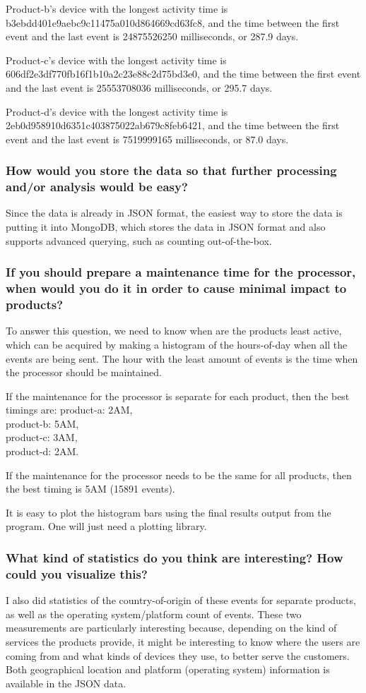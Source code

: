 \documentclass[12pt,letter]{article}
\begin{document}
  Product-b's device with the longest activity time is b3ebdd401e9aebc9c11475a010d864669cd63fc8, and the
  time between the first event and the last event is 24875526250 milliseconds,
  or 287.9 days.

  Product-c's device with the longest activity time is
  606df2e3df770fb16f1b10a2c23e88c2d75bd3e0, and the
  time between the first event and the last event is 25553708036 milliseconds,
  or 295.7 days.

  Product-d's device with the longest activity time is
  2eb0d958910d6351c403875022ab679c8feb6421, and the
  time between the first event and the last event is 7519999165 milliseconds,
  or 87.0 days.

  \subsubsection{How would you store the data so that further processing and/or
  analysis would be easy?}
  Since the data is already in JSON format, the easiest way to store the data is
  putting it into MongoDB, which stores the data in JSON format and also supports
  advanced querying, such as counting out-of-the-box.

  \subsubsection{If you should prepare a maintenance time for the processor,
  when would you do it in order to cause minimal impact to products?}
  To answer this question, we need to know when are the products least active,
  which can be acquired by making a histogram of the hours-of-day when all the events
  are being sent. The hour with the least amount of events is the time when the
  processor should be maintained.

  If the maintenance for the processor is separate for each product, then the
  best timings are:
  product-a: 2AM,\\
  product-b: 5AM,\\
  product-c: 3AM,\\
  product-d: 2AM.

  If the maintenance for the processor needs to be the same for all products,
  then the best timing is 5AM (15891 events).

  It is easy to plot the histogram bars using the final results output from the
  program. One will just need a plotting library.

  \subsubsection{What kind of statistics do you think are interesting? How could
  you visualize this?}
  I also did statistics of the country-of-origin of these events for separate
  products, as well as the operating system/platform count of events. These two
  measurements are particularly interesting because, depending on the kind of
  services the products provide, it might be interesting to know where the
  users are coming from and what kinds of devices they use, to better serve the
  customers. Both geographical location and platform (operating system)
  information is available in the JSON data.
\end{document}
